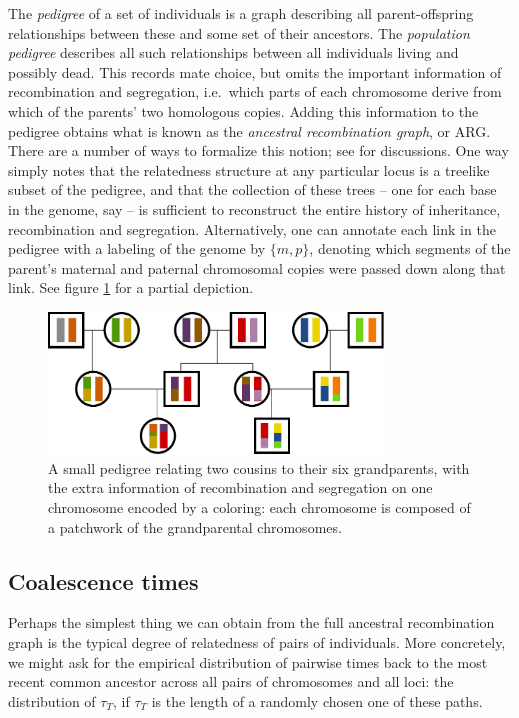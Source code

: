 The \emph{pedigree} of a set of individuals is a graph 
describing all parent-offspring relationships between these
and some set of their ancestors.
The \emph{population pedigree} describes all such relationships
between all individuals living and possibly dead.
This records mate choice,
but omits the important information of recombination and segregation,
i.e.\ which parts of each chromosome derive from which of the parents' two homologous copies.
Adding this information to the pedigree obtains what is known as the \emph{ancestral recombination graph}, or ARG.
There are a number of ways to formalize this notion;
see \citep{marjoram,hudson} for discussions.
One way simply notes that the relatedness structure at any particular locus
is a treelike subset of the pedigree,
and that the collection of these trees -- one for each base in the genome, say --
is sufficient to reconstruct the entire history of inheritance, recombination and segregation.
Alternatively, one can annotate each link in the pedigree with a labeling of the genome by $\{m,p\}$,
denoting which segments of the parent's maternal and paternal chromosomal copies were passed down along that link.
See figure \ref{fig:pedigree_ibd} for a partial depiction.

\begin{figure}[ht!]
  \begin{center}
    \includegraphics[width=3.5in]{pedigree-ibd-recombination}
  \end{center}
  \caption{
  A small pedigree relating two cousins to their six grandparents,
  with the extra information of recombination and segregation on one chromosome
  encoded by a coloring: each chromosome is composed
  of a patchwork of the grandparental chromosomes.
  \label{fig:pedigree_ibd}
  }
\end{figure}

\subsection{Coalescence times}

Perhaps the simplest thing we can obtain from the full ancestral recombination graph 
is the typical degree of relatedness of pairs of individuals.
More concretely, we might ask for the empirical distribution
of pairwise times back to the most recent common ancestor
across all pairs of chromosomes and all loci:
the distribution of $\tau_T$, if $\tau_T$ is the length of a randomly chosen one of these paths.

